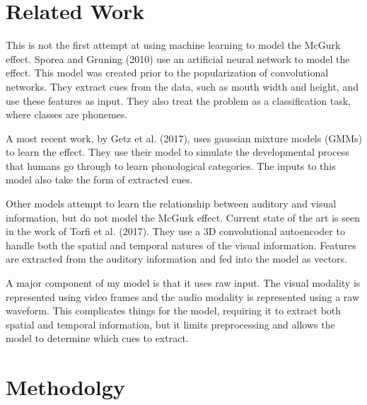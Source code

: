 \documentclass[conference]{IEEEtran}
\begin{document}

\section{Related Work}
This is not the first attempt at using machine learning to model the McGurk effect. Sporea and Gruning (2010) use an artificial neural network to model the effect.\cite{Sporea2010} This model was created prior to the popularization of convolutional networks. They extract cues from the data, such as mouth width and height, and use these features as input. They also treat the problem as a classification task, where classes are phonemes.

A most recent work, by Getz et al. (2017), uses gaussian mixture models (GMMs) to learn the effect.\cite{Getz2017} They use their model to simulate the developmental process that humans go through to learn phonological categories. The inputs to this model also take the form of extracted cues.

Other models attempt to learn the relationship between auditory and visual information, but do not model the McGurk effect. Current state of the art is seen in the work of Torfi et al. (2017).\cite{Torfi2017} They use a 3D convolutional autoencoder to handle both the spatial and temporal natures of the visual information. Features are extracted from the auditory information and fed into the model as vectors.

A major component of my model is that it uses raw input. The visual modality is represented using video frames and the audio modality is represented using a raw waveform. This complicates things for the model, requiring it to extract both spatial and temporal information, but it limits preprocessing and allows the model to determine which cues to extract.

\section{Methodolgy}
\end{document}
